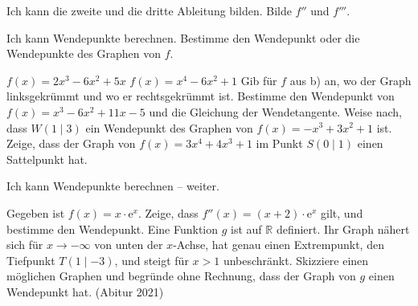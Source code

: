 \setcounter{aufgabe}{23}
\hypertarget{e3}{}

\begin{aufgabe}{Ich kann die zweite und die dritte Ableitung bilden. Bilde $f''$ und $f'''$.}
\begin{geruest}
\end{geruest}
\end{aufgabe}

\begin{aufgabe}{Ich kann Wendepunkte berechnen. Bestimme den Wendepunkt oder die Wendepunkte des Graphen von $f$.}
\begin{teile}
\teil $f(x) = 2x^3 - 6x^2 + 5x$
\teil $f(x) = x^4 - 6x^2 + 1$
\teil Gib für $f$ aus b) an, wo der Graph linksgekrümmt und wo er rechtsgekrümmt ist.
\teil Bestimme den Wendepunkt von $f(x) = x^3 - 6x^2 + 11x - 5$ und die Gleichung der Wendetangente.
\teil Weise nach, dass $W(1 \mid 3)$ ein Wendepunkt des Graphen von $f(x) = -x^3 + 3x^2 + 1$ ist.
\teil Zeige, dass der Graph von $f(x) = 3x^4 + 4x^3 + 1$ im Punkt $S(0 \mid 1)$ einen Sattelpunkt hat.
\end{teile}
\end{aufgabe}

\begin{aufgabe}{Ich kann Wendepunkte berechnen – weiter.}
\begin{teile}
\teil Gegeben ist $f(x) = x\cdot\mathrm{e}^{x}$. Zeige, dass $f''(x) = (x + 2)\cdot\mathrm{e}^{x}$ gilt, und bestimme den Wendepunkt.
\teil Eine Funktion $g$ ist auf $\mathbb{R}$ definiert. Ihr Graph nähert sich für $x \to -\infty$ von unten der $x$-Achse, hat genau einen Extrempunkt, den Tiefpunkt $T(1 \mid -3)$, und steigt für $x > 1$ unbeschränkt. Skizziere einen möglichen Graphen und begründe ohne Rechnung, dass der Graph von $g$ einen Wendepunkt hat. (Abitur 2021)
\end{teile}

\begin{ksys}[xmin=-6,xmax=4,ymin=-4,ymax=3]
\end{ksys}

\end{aufgabe}

